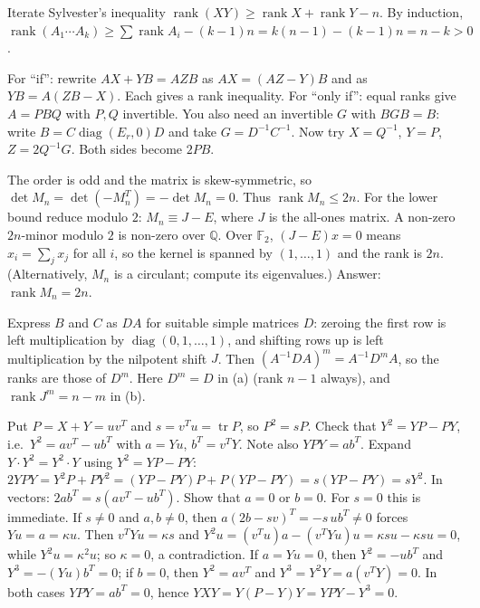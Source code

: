 \documentclass[11pt,a4paper]{article}
\begin{document}
Iterate Sylvester's inequality \(\operatorname{rank}(XY)\ge\operatorname{rank}X+\operatorname{rank}Y-n\).
By induction, \(\operatorname{rank}(A_1\cdots A_k)\ge\sum\operatorname{rank}A_i-(k-1)n=k(n-1)-(k-1)n=n-k\gt0\).

For ``if'': rewrite \(AX+YB=AZB\) as \(AX=(AZ-Y)B\) and as \(YB=A(ZB-X)\). Each gives a rank inequality.
For ``only if'': equal ranks give \(A=PBQ\) with \(P,Q\) invertible. You also need an invertible \(G\) with \(BGB=B\): write \(B=C\operatorname{diag}(E_r,0)D\) and take \(G=D^{-1}C^{-1}\).
Now try \(X=Q^{-1}\), \(Y=P\), \(Z=2Q^{-1}G\). Both sides become \(2PB\).

The order is odd and the matrix is skew-symmetric, so \(\det M_n=\det(-M_n^T)=-\det M_n=0\). Thus \(\operatorname{rank}M_n\le 2n\).
For the lower bound reduce modulo \(2\): \(M_n\equiv J-E\), where \(J\) is the all-ones matrix. A non-zero \(2n\)-minor modulo \(2\) is non-zero over \(\mathbb Q\).
Over \(\mathbb F_2\), \((J-E)x=0\) means \(x_i=\sum_jx_j\) for all \(i\), so the kernel is spanned by \((1,\dots,1)\) and the rank is \(2n\). (Alternatively, \(M_n\) is a circulant; compute its eigenvalues.) Answer: \(\operatorname{rank}M_n=2n\).

Express \(B\) and \(C\) as \(DA\) for suitable simple matrices \(D\): zeroing the first row is left multiplication by \(\operatorname{diag}(0,1,\dots,1)\), and shifting rows up is left multiplication by the nilpotent shift \(J\).
Then \((A^{-1}DA)^m=A^{-1}D^mA\), so the ranks are those of \(D^m\). Here \(D^m=D\) in (a) (rank \(n-1\) always), and \(\operatorname{rank}J^m=n-m\) in (b).

Put \(P=X+Y=uv^T\) and \(s=v^Tu=\operatorname{tr}P\), so \(P^2=sP\). Check that \(Y^2=YP-PY\), i.e.~\(Y^2=av^T-ub^T\) with \(a=Yu\), \(b^T=v^TY\). Note also \(YPY=ab^T\).
Expand \(Y\cdot Y^2=Y^2\cdot Y\) using \(Y^2=YP-PY\): \(2YPY=Y^2P+PY^2=(YP-PY)P+P(YP-PY)=s(YP-PY)=sY^2\). In vectors: \(2ab^T=s(av^T-ub^T)\).
Show that \(a=0\) or \(b=0\). For \(s=0\) this is immediate. If \(s\ne0\) and \(a,b\ne0\), then \(a(2b-sv)^T=-s\,ub^T\ne0\) forces \(Yu=a=\kappa u\). Then \(v^TYu=\kappa s\) and \(Y^2u=(v^Tu)a-(v^TYu)u=\kappa su-\kappa su=0\), while \(Y^2u=\kappa^2u\); so \(\kappa=0\), a contradiction.
If \(a=Yu=0\), then \(Y^2=-ub^T\) and \(Y^3=-(Yu)b^T=0\); if \(b=0\), then \(Y^2=av^T\) and \(Y^3=Y^2Y=a(v^TY)=0\). In both cases \(YPY=ab^T=0\), hence \(YXY=Y(P-Y)Y=YPY-Y^3=0\).
\end{document}
